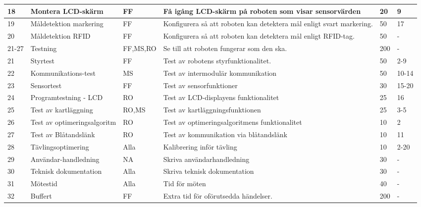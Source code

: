 \documentclass[11pt]{article}
\begin{document}
\begin{flushleft}
\begin{longtable}{|l|p{.20\linewidth}|l|p{.30\linewidth}|p{.10\linewidth}|p{.10\linewidth}|}
18 &
Montera LCD-skärm&
FF &
Få igång LCD-skärm på roboten som visar sensorvärden&
20 &
9 \\ \hline

19 &
Måldetektion markering&
FF &
Konfigurera så att roboten kan detektera mål enligt svart markering.&
50 &
17 \\ \hline

20 &
Måldetektion RFID&
FF &
Konfigurera så att roboten kan detektera mål enligt RFID-tag.&
50 &
- \\ \hline

21-27 &
Testning&
FF,MS,RO &
Se till att roboten fungerar som den ska.&
200 &
- \\ \hline

21 &
Styrtest&
FF &
Test av robotens styrfunktionalitet.&
50 &
2-9 \\ \hline

22 &
Kommunikations-test &
MS &
Test av intermodulär kommunikation &
50 &
10-14 \\ \hline

23 &
Sensortest &
FF &
Test av sensorfunktioner &
30 &
15-20 \\ \hline

24 &
Programtestning - LCD &
RO &
Test av LCD-displayens funktionalitet &
25 &
16 \\ \hline

25 &
Test av kartläggning &
RO,MS &
Test av kartläggningsfunktionen &
25 &
3-5 \\ \hline

26 &
Test av optimeringsalgoritm &
RO &
Test av optimeringsalgoritmens funktionalitet &
10 &
2 \\ \hline

27 &
Test av Blåtandslänk &
RO &
Test av kommunikation via blåtandslänk &
10 &
11 \\ \hline
 
28 &
Tävlingsoptimering &
Alla &
Kalibrering inför tävling &
10 &
2-20 \\ \hline 
 
29 &
Användar-handledning &
NA &
Skriva användarhandledning &
30 &
- \\ \hline 
 
30 &
Teknisk dokumentation &
Alla &
Skriva teknisk dokumentation &
30 &
- \\ \hline  
 
31 &
Mötestid&
Alla &
Tid för möten&
40 &
- \\ \hline

32 &
Buffert&
FF &
Extra tid för oförutsedda händelser.&
200 &
- \\ \hline


\end{longtable}
\end{flushleft}
\end{document}
